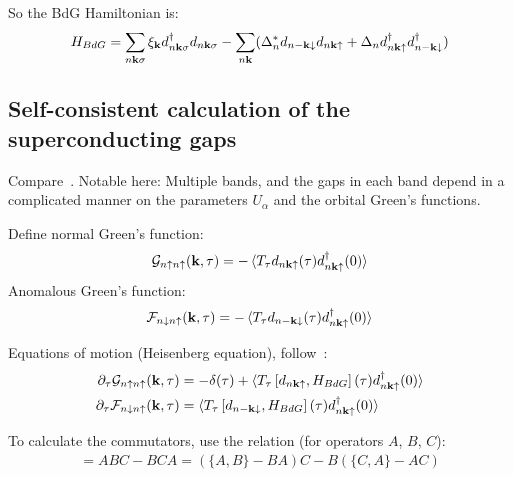 \documentclass[../main.tex]{subfiles}
\begin{document}
So the BdG Hamiltonian is:
\begin{align}
    H_{BdG} = \sum_{n \bm{\mathrm{k}} \sigma} \xi_{\bm{\mathrm{k}}} d_{n \bm{\mathrm{k}} \sigma}^{\dagger} d_{n \bm{\mathrm{k}} \sigma}
    -\sum_{n \bm{\mathrm{k}}} (\Delta_n^* d_{n -\bm{\mathrm{k}} \downarrow} d_{n \bm{\mathrm{k}} \uparrow} + \Delta_n d_{n \bm{\mathrm{k}} \uparrow}^{\dagger} d_{n -\bm{\mathrm{k}} \downarrow}^{\dagger})
\end{align}

\subsection{Self-consistent calculation of the superconducting gaps}

Compare~\cite[ch. 10]{Bruus_Flensberg_2004}.
Notable here: Multiple bands, and the gaps in each band depend in a complicated manner on the parameters \(U_{\alpha}\) and the orbital Green's functions.

Define normal Green's function:
\begin{equation}
    \mathcal{G}_{n\uparrow n\uparrow} (\bm{\mathrm{k}}, \tau) = -\braket{T_{\tau} d_{n \bm{\mathrm{k}} \uparrow} (\tau) d_{n \bm{\mathrm{k}} \uparrow}^{\dagger} (0)}
\end{equation}
Anomalous Green's function:
\begin{equation}
    \mathcal{F}_{n\downarrow n\uparrow} (\bm{\mathrm{k}}, \tau) = -\braket{T_{\tau} d_{n -\bm{\mathrm{k}} \downarrow} (\tau) d_{n \bm{\mathrm{k}} \uparrow}^{\dagger} (0)}
\end{equation}

Equations of motion (Heisenberg equation), follow~\cite[ch. 17]{Bruus_Flensberg_2004}:
\begin{align}
    \pdif{\tau} \mathcal{G}_{n\uparrow n\uparrow} (\vb{k}, \tau) &= -\delta (\tau) + \braket{T_{\tau} \left[d_{n \vb{k} \uparrow}, H_{BdG}\right] (\tau) d_{n \vb{k} \uparrow}^{\dagger} (0)} \\
    \pdif{\tau} \mathcal{F}_{n\downarrow n\uparrow} (\vb{k}, \tau) &= \braket{T_{\tau} \left[d_{n -\vb{k} \downarrow}, H_{BdG}\right] (\tau) d_{n \vb{k} \uparrow}^{\dagger} (0)}
\end{align}

To calculate the commutators, use the relation (for operators \(A\), \(B\), \(C\)):
\begin{align}
    [A, BC] = ABC - BCA = (\{A, B\} - BA) C - B(\{C, A\} - AC)
\end{align}
\end{document}
